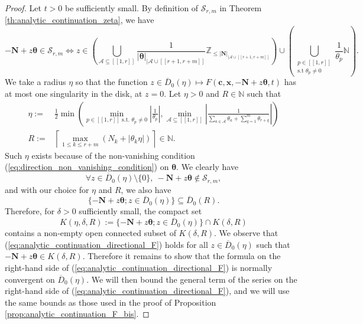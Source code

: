 \documentclass[a4paper]{amsart}
\theoremstyle{remark}
\theoremstyle{definition}
\begin{document}
\begin{proof}
Let $t>0$ be sufficiently small. By definition of $\mathcal{S}_{r,m}$ in Theorem \ref{th:analytic_continuation_zeta}, we have
$$ -\mathbf{N}+z\bm{\theta} \in \mathcal{S}_{r,m} \iff z \in \left( \bigcup_{\mathcal{A} \subseteq [\![ 1,r ]\!]} \frac{1}{|\bm{\theta}|_{|\mathcal{A} \cup [\![ r+1,r+m ]\!]}} \mathbb{Z}_{\leq |\mathbf{N}|_{|\mathcal{A} \cup [\![ r+1,r+m ]\!]}} \right) \cup \left( \bigcup_{\substack{p \in [\![ 1,r ]\!] \\ \text{s.t } \theta_p \neq 0}} \frac{1}{\theta_p} \mathbb{N}\right). $$
We take a radius $\eta$ so that the function $z \in \overline{D}_0(\eta) \mapsto F(\mathbf{c},\mathbf{x},-\mathbf{N}+z\bm{\theta},t)$ has at most one singularity in the disk, at $z=0$. Let $\eta>0$ and $R \in \mathbb{N}$ such that
\begin{align*}
    \eta :=& \frac{1}{2} \min\left( \min_{p \in [\![1,r]\!] \text{ s.t. } \theta_p \neq 0} \left| \frac{1}{\theta_p} \right| ,\min_{\mathcal{A} \subseteq [\![ 1,r ]\!]} \left| \frac{1}{\sum_{a \in \mathcal{A}}\theta_{a}+\sum_{q=1}^m \theta_{r+q}} \right|\right) \\
    R :=& \left\lceil \max_{1 \leq k \leq r+m}(N_{k}+|\theta_k\eta|)\right\rceil \in \mathbb{N}.
\end{align*}
Such $\eta$ exists because of the non-vanishing condition (\ref{eq:direction_non_vanishing_condition}) on $\bm{\theta}$. We clearly have
$$ \forall z \in \overline{D}_0(\eta) \setminus \{ 0 \}, \ -\mathbf{N}+z\bm{\theta} \not \in \mathcal{S}_{r,m}, $$
and with our choice for $\eta$ and $R$, we also have
$$ \{ -\mathbf{N}+z\bm{\theta}; z \in \overline{D}_0(\eta) \} \subseteq \overline{D}_0(R). $$
Therefore, for $\delta>0$ sufficiently small, the compact set
$$ K(\eta,\delta,R):=\{ -\mathbf{N}+z\bm{\theta}; z \in \overline{D}_0(\eta) \} \cap K(\delta,R) $$
contains a non-empty open connected subset of $K(\delta,R)$. We observe that (\ref{eq:analytic_continuation_directional_F}) holds for all $z \in \overline{D}_0(\eta)$ such that $-\mathbf{N}+z\bm{\theta} \in K(\delta,R)$. Therefore it remains to show that the formula on the right-hand side of (\ref{eq:analytic_continuation_directional_F}) is normally convergent on $\overline{D}_0(\eta)$. We will then bound the general term of the series on the right-hand side of (\ref{eq:analytic_continuation_directional_F}), and we will use the same bounds as those used in the proof of Proposition \ref{prop:analytic_continuation_F_bis}.


\end{proof}
\end{document}
